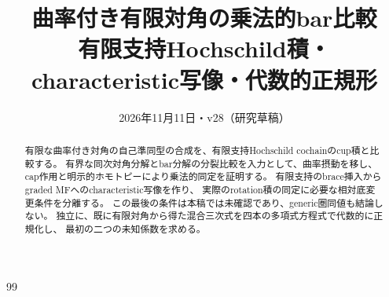 
\title{曲率付き有限対角の乗法的bar比較\\\large 有限支持Hochschild積・characteristic写像・代数的正規形}
\author{}
\date{2026年11月11日・v28（研究草稿）}

\maketitle
\begin{abstract}
有限な曲率付き対角の自己準同型の合成を、有限支持Hochschild cochainのcup積と比較する。
有界な同次対角分解とbar分解の分裂比較を入力として、曲率摂動を移し、
cap作用と明示的ホモトピーにより乗法的同定を証明する。
有限支持のbrace挿入からgraded MFへのcharacteristic写像を作り、
実際のrotation積の同定に必要な相対底変更条件を分離する。
この最後の条件は本稿では未確認であり、generic圏同値も結論しない。
独立に、既に有限対角から得た混合三次式を四本の多項式方程式で代数的に正規化し、
最初の二つの未知係数を求める。
\end{abstract}
\tableofcontents

\begin{thebibliography}{99}

\end{thebibliography}

